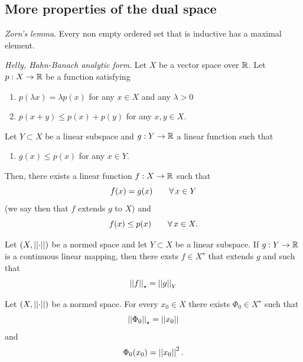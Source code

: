 \documentclass{article}
\begin{document}
\subsection{More properties of the dual space}
\begin{theorem}
	\emph{Zorn's lemma}. Every non empty ordered set that is inductive has a maximal element.
\end{theorem}
\begin{theorem}
	\emph{Helly, Hahn-Banach analytic form}. Let $X$ be a vector space over $\mathbb{R}$. Let $p:X\to\mathbb{R}$ be a function satisfying
	\begin{enumerate}
		\item $p(\lambda x)=\lambda p(x)$ for any $x\in X$ and any $\lambda>0$\\
		\item $p(x+y)\leq p(x)+p(y)$ for any $x,y\in X$.
	\end{enumerate} 
	Let $Y\subset X$ be a linear subspace and $g:Y\to\mathbb{R}$ a linear function such that
	\begin{enumerate}
		\item[3] $g(x)\leq p(x)$ for any $x\in Y$.  
	\end{enumerate}
	Then, there exists a linear function $f:X\to\mathbb{R}$ such that
	\begin{equation*}
		f(x)=g(x)\qquad\forall\, x\in Y
	\end{equation*}
	(we say then that $f$ extends $g$ to $X$) and
	\begin{equation*}
		f(x)\leq p(x)\qquad\forall\, x\in X.
	\end{equation*}
\end{theorem}
\begin{corollary}
	Let $\left(X,\left|\left|\cdot\right|\right|\right)$ be a normed space and let $Y\subset X$ be a linear subspace. If $g:Y\to\mathbb{R}$ is a continuous linear mapping, then there exsts $f\in X^{\star}$ that extends $g$ and such that
	\begin{equation*}
		\left|\left|f\right|\right|_{\star}=\left|\left|g\right|\right|_{Y}
	\end{equation*}
\end{corollary}
\begin{corollary}
	Let $\left(X,\left|\left|\cdot\right|\right|\right)$ be a normed space. For every $x_{0}\in X$ there exists $\Phi_{0}\in X^{\star}$ such that 
	\begin{equation*}
		\left|\left|\Phi_{0}\right|\right|_{\star}=\left|\left|x_{0}\right|\right|
	\end{equation*}
	and
	\begin{equation*}
		\Phi_{0}(x_{0})=\left|\left|x_{0}\right|\right|^{2}.
	\end{equation*}
\end{corollary}
\end{document}
